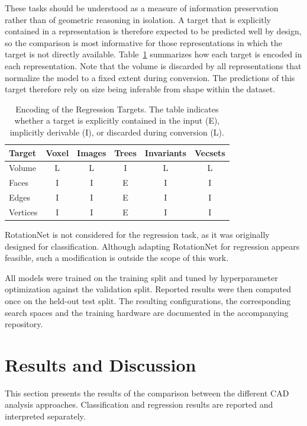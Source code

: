 \documentclass[5p,times,procedia]{elsarticle}
\begin{document}
These tasks should be understood as a measure of information preservation rather than of geometric reasoning in isolation. A target that is explicitly contained in a representation is therefore expected to be predicted well by design, so the comparison is most informative for those representations in which the target is not directly available. Table~\ref{tab:encoding} summarizes how each target is encoded in each representation. Note that the volume is discarded by all representations that normalize the model to a fixed extent during conversion. The predictions of this target therefore rely on size being inferable from shape within the dataset.

\begin{table}[h]
\caption{Encoding of the Regression Targets. The table indicates whether a target is explicitly contained in the input (E), implicitly derivable (I), or discarded during conversion (L).}
\label{tab:encoding}
\begin{tabular*}{\columnwidth}{@{\extracolsep{\fill}}lccccc@{}}
\hline
Target & Voxel & Images & Trees & Invariants & Vecsets \\
\hline
Volume & L & L & I & L & L \\
Faces & I & I & E & I & I \\
Edges & I & I & E & I & I \\
Vertices & I & I & E & I & I \\
\hline
\end{tabular*}
\end{table}

RotationNet is not considered for the regression task, as it was originally designed for classification.
Although adapting RotationNet for regression appears feasible, such a modification is outside the scope of this work. 

All models were trained on the training split and tuned by hyperparameter optimization against the validation split. Reported results were then computed once on the held-out test split. The resulting configurations, the corresponding search spaces and the training hardware are documented in the accompanying repository.

\section{Results and Discussion}\label{sec:results-and-discussion}
This section presents the results of the comparison between the different CAD analysis approaches.
Classification and regression results are reported and interpreted separately.
\end{document}
